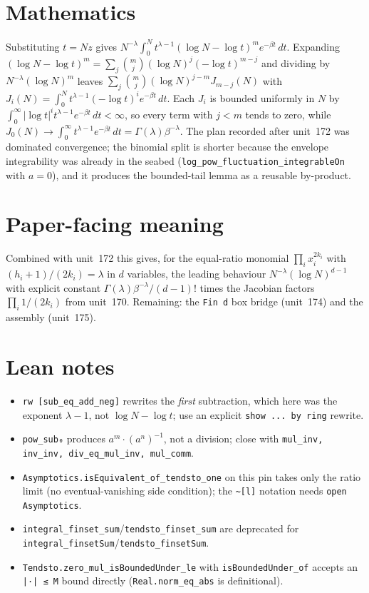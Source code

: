 \documentclass[11pt]{article}
\begin{document}
\section{Mathematics}
Substituting $t=Nz$ gives
$N^{-\lambda}\int_0^N t^{\lambda-1}(\log N-\log t)^m e^{-\beta t}\,dt$. Expanding
$(\log N-\log t)^m=\sum_j\binom mj(\log N)^j(-\log t)^{m-j}$ and dividing by
$N^{-\lambda}(\log N)^m$ leaves
$\sum_j\binom mj(\log N)^{j-m}J_{m-j}(N)$ with
$J_i(N)=\int_0^N t^{\lambda-1}(-\log t)^ie^{-\beta t}\,dt$. Each $J_i$ is bounded uniformly in $N$
by $\int_0^\infty|\log t|^it^{\lambda-1}e^{-\beta t}\,dt<\infty$, so every term with $j<m$ tends to
zero, while $J_0(N)\to\int_0^\infty t^{\lambda-1}e^{-\beta t}\,dt=\Gamma(\lambda)\beta^{-\lambda}$.
The plan recorded after unit~172 was dominated convergence; the binomial split is shorter because the
envelope integrability was already in the seabed (\texttt{log\_pow\_fluctuation\_integrableOn} with
$a=0$), and it produces the bounded-tail lemma as a reusable by-product.

\section{Paper-facing meaning}
Combined with unit~172 this gives, for the equal-ratio monomial $\prod_i x_i^{2k_i}$ with
$(h_i+1)/(2k_i)=\lambda$ in $d$ variables, the leading behaviour
$N^{-\lambda}(\log N)^{d-1}$ with explicit constant $\Gamma(\lambda)\beta^{-\lambda}/(d-1)!$ times the
Jacobian factors $\prod_i 1/(2k_i)$ from unit~170. Remaining: the \texttt{Fin d} box bridge
(unit~174) and the assembly (unit~175).

\section{Lean notes}
\begin{itemize}
\item \texttt{rw [sub\_eq\_add\_neg]} rewrites the \emph{first} subtraction, which here was the
exponent $\lambda-1$, not $\log N-\log t$; use an explicit \texttt{show ... by ring} rewrite.
\item \texttt{pow\_sub₀} produces $a^m\cdot(a^n)^{-1}$, not a division; close with
\texttt{mul\_inv, inv\_inv, div\_eq\_mul\_inv, mul\_comm}.
\item \texttt{Asymptotics.isEquivalent\_of\_tendsto\_one} on this pin takes only the ratio limit
(no eventual-vanishing side condition); the \texttt{\textasciitilde[l]} notation needs
\texttt{open Asymptotics}.
\item \texttt{integral\_finset\_sum}/\texttt{tendsto\_finset\_sum} are deprecated for
\texttt{integral\_finsetSum}/\texttt{tendsto\_finsetSum}.
\item \texttt{Tendsto.zero\_mul\_isBoundedUnder\_le} with \texttt{isBoundedUnder\_of} accepts an
\texttt{|·| ≤ M} bound directly (\texttt{Real.norm\_eq\_abs} is definitional).
\end{itemize}
\end{document}
